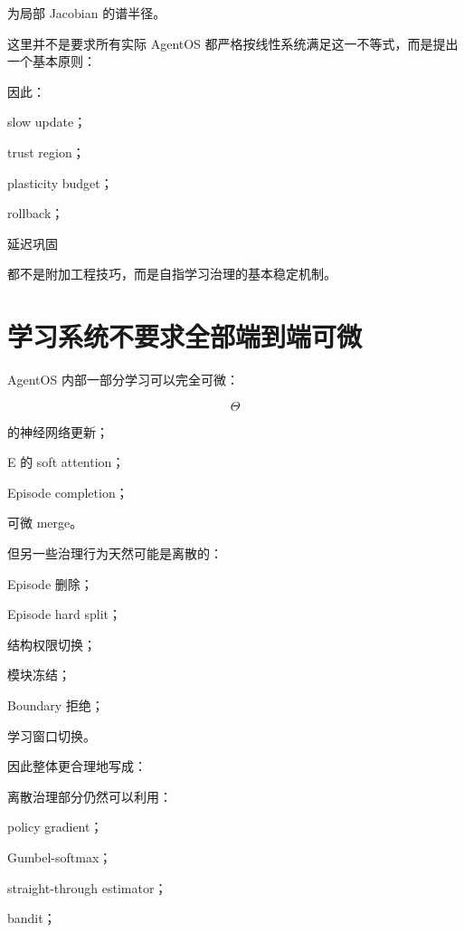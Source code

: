 为局部 Jacobian 的谱半径。

这里并不是要求所有实际 AgentOS 都严格按线性系统满足这一不等式，而是提出一个基本原则：

\begin{statementbox}
\centering
{}
\end{statementbox}

因此：

slow update；

trust region；

plasticity budget；

rollback；

延迟巩固

都不是附加工程技巧，而是自指学习治理的基本稳定机制。


\section{学习系统不要求全部端到端可微}

AgentOS 内部一部分学习可以完全可微：

\[
\Theta
\]

的神经网络更新；

E 的 soft attention；

Episode completion；

可微 merge。

但另一些治理行为天然可能是离散的：

Episode 删除；

Episode hard split；

结构权限切换；

模块冻结；

Boundary 拒绝；

学习窗口切换。

因此整体更合理地写成：

\begin{statementbox}
\centering
{}
\end{statementbox}

离散治理部分仍然可以利用：

policy gradient；

Gumbel-softmax；

straight-through estimator；

bandit；


